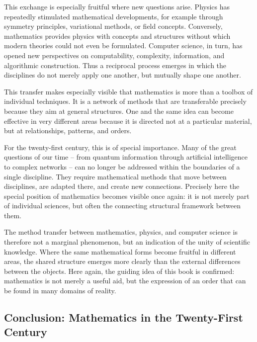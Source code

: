 This exchange is especially fruitful
where new questions arise.
Physics has repeatedly stimulated mathematical developments,
for example through symmetry principles,
variational methods,
or field concepts.
Conversely, mathematics provides physics with concepts and structures
without which modern theories could not even be formulated.
Computer science, in turn, has opened new perspectives
on computability,
complexity,
information,
and algorithmic construction.
Thus a reciprocal process emerges
in which the disciplines do not merely apply one another,
but mutually shape one another.

This transfer makes especially visible
that mathematics is more than a toolbox of individual techniques.
It is a network of methods
that are transferable precisely because
they aim at general structures.
One and the same idea can become effective
in very different areas
because it is directed not at a particular material,
but at relationships,
patterns,
and orders.

For the twenty-first century, this is of special importance.
Many of the great questions of our time --
from quantum information
through artificial intelligence
to complex networks --
can no longer be addressed within the boundaries of a single discipline.
They require mathematical methods
that move between disciplines,
are adapted there,
and create new connections.
Precisely here the special position of mathematics becomes visible once again:
it is not merely part of individual sciences,
but often the connecting structural framework between them.

The method transfer between mathematics, physics, and computer science
is therefore not a marginal phenomenon,
but an indication of the unity of scientific knowledge.
Where the same mathematical forms become fruitful in different areas,
the shared structure emerges more clearly
than the external differences between the objects.
Here again, the guiding idea of this book is confirmed:
mathematics is not merely a useful aid,
but the expression of an order
that can be found in many domains of reality.


\subsection{Conclusion: Mathematics in the Twenty-First Century}

